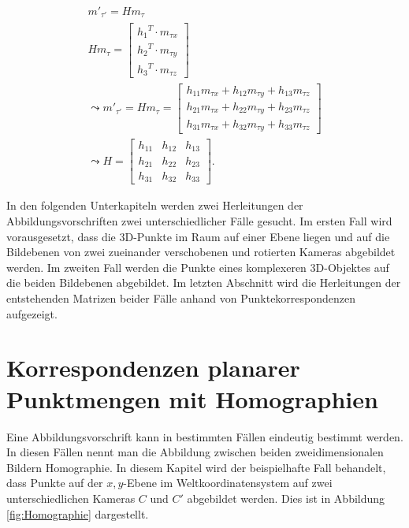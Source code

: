 \begin{gather}
	m'_{\tau'} = Hm_{\tau}\\
	Hm_{\tau} = \begin{bmatrix}
		{h_1}^T \cdot m_{\tau x}\\{h_2}^T \cdot m_{\tau y}\\{h_3}^T \cdot m_{\tau z}
	\end{bmatrix} \\
	\leadsto 
	m'_{\tau'}= Hm_{\tau}= \begin{bmatrix}
		h_{11}m_{\tau x}+h_{12}m_{\tau y}+h_{13}m_{\tau z}\\
		h_{21}m_{\tau x}+h_{22}m_{\tau y}+h_{23}m_{\tau z}\\
		h_{31}m_{\tau x}+h_{32}m_{\tau y}+h_{33}m_{\tau z}
	\end{bmatrix}\\
	\leadsto 
	H=\begin{bmatrix}
		h_{11}&h_{12}&h_{13}\\
		h_{21}&h_{22}&h_{23}\\
		h_{31}&h_{32}&h_{33}
	\end{bmatrix}.
\end{gather}


In den folgenden Unterkapiteln werden zwei Herleitungen der Abbildungsvorschriften zwei unterschiedlicher Fälle gesucht. Im ersten Fall wird vorausgesetzt, dass die 3D-Punkte im Raum auf einer Ebene liegen und auf die Bildebenen von zwei zueinander verschobenen und rotierten Kameras abgebildet werden. Im zweiten Fall werden die Punkte eines komplexeren 3D-Objektes auf die beiden Bildebenen abgebildet. Im letzten Abschnitt wird die Herleitungen der entstehenden Matrizen beider Fälle anhand von Punktekorrespondenzen aufgezeigt. 


\section{Korrespondenzen planarer Punktmengen mit Homographien}

Eine Abbildungsvorschrift kann in bestimmten Fällen eindeutig bestimmt werden. In diesen Fällen nennt man die Abbildung zwischen beiden zweidimensionalen Bildern Homographie\cite{HZ,Elements,Roser}. In diesem Kapitel wird der beispielhafte Fall behandelt, dass Punkte auf der $x,y$-Ebene im Weltkoordinatensystem auf zwei unterschiedlichen Kameras $C$ und $C'$ abgebildet werden. Dies ist in Abbildung \ref{fig:Homographie} dargestellt.
\pagebreak


